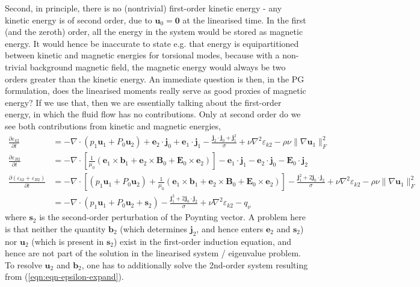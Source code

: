 Second, in principle, there is no (nontrivial) first-order kinetic energy - any kinetic energy is of second order, due to $\mathbf{u}_0 = \mathbf{0}$ at the linearised time. In the first (and the zeroth) order, all the energy in the system would be stored as magnetic energy.
It would hence be inaccurate to state e.g. that energy is equipartitioned between kinetic and magnetic energies for torsional modes, because with a non-trivial background magnetic field, the magnetic energy would always be two orders greater than the kinetic energy. 
An immediate question is then, in the PG formulation, does the linearised moments really serve as good proxies of magnetic energy? If we use that, then we are essentially talking about the first-order energy, in which the fluid flow has no contributions.
Only at second order do we see both contributions from kinetic and magnetic energies,
%
\begin{equation}\begin{aligned}\label{eqn:energy-eqn-order2}
    \frac{\partial \varepsilon_{k2}}{\partial t} &= - \nabla \cdot (p_1\mathbf{u}_1 + P_0\mathbf{u}_2) + \mathbf{e}_2 \cdot \mathbf{j}_0 + \mathbf{e}_1\cdot \mathbf{j}_1 - \frac{\mathbf{j}_2\cdot \mathbf{j}_0 + \mathbf{j}_1^2}{\sigma} + \nu \nabla^2 \varepsilon_{k2} - \rho \nu \|\nabla \mathbf{u}_1\|_F^2 \\ 
    \frac{\partial \varepsilon_{B2}}{\partial t} &= -\nabla\cdot \left[\frac{1}{\mu_0} (\mathbf{e}_1 \times \mathbf{b}_1 + \mathbf{e}_2\times \mathbf{B}_0 + \mathbf{E}_0\times \mathbf{e}_2)\right] - \mathbf{e}_1\cdot \mathbf{j}_1 - \mathbf{e}_2\cdot \mathbf{j}_0 - \mathbf{E}_0\cdot \mathbf{j}_2 \\ 
    \frac{\partial (\varepsilon_{k2} + \varepsilon_{B2})}{\partial t} &= -\nabla\cdot \left[(p_1\mathbf{u}_1 + P_0\mathbf{u}_2) + \frac{1}{\mu_0} (\mathbf{e}_1 \times \mathbf{b}_1 + \mathbf{e}_2\times \mathbf{B}_0 + \mathbf{E}_0\times \mathbf{e}_2)\right] - \frac{\mathbf{j}_1^2 + 2\mathbf{j}_0\cdot \mathbf{j}_2}{\sigma} + \nu \nabla^2 \varepsilon_{k2} - \rho \nu \|\nabla \mathbf{u}_1\|_F^2 \\ 
    &= -\nabla\cdot \left(p_1\mathbf{u}_1 + P_0\mathbf{u}_2 + \mathbf{s}_2\right) - \frac{\mathbf{j}_1^2 + 2\mathbf{j}_0\cdot \mathbf{j}_2}{\sigma} + \nu \nabla^2 \varepsilon_{k2} - q_\nu
\end{aligned}\end{equation}
%
where $\mathbf{s}_2$ is the second-order perturbation of the Poynting vector. A problem here is that neither the quantity $\mathbf{b}_2$ (which determines $\mathbf{j}_2$, and hence enters $\mathbf{e}_2$ and $\mathbf{s}_2$) nor $\mathbf{u}_2$ (which is present in $\mathbf{s}_2$) exist in the first-order induction equation, and hence are not part of the solution in the linearised system / eigenvalue problem.
To resolve $\mathbf{u}_2$ and $\mathbf{b}_2$, one has to additionally solve the 2nd-order system resulting from (\ref{eqn:eqn-epsilon-expand}).

